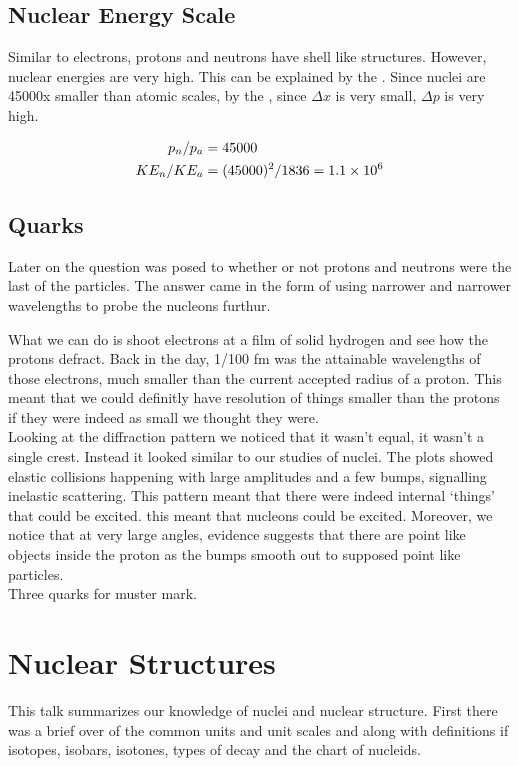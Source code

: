 \documentclass[english, 11pt]{article}
\begin{document}
    \subsection{Nuclear Energy Scale}

    Similar to electrons, protons and neutrons have shell like structures. However, nuclear energies are very high. This can be explained by the . Since nuclei are 45000x smaller than atomic scales, by the , since $\Delta x$ is very small, $\Delta p$ is very high. 

    \begin{align*}
      p_n / p_a &= 45000\\
      KE_n / KE_a &= (45000)^2 / 1836 = 1.1\times 10^{6}
    \end{align*}

    \subsection{Quarks}

    Later on the question was posed to whether or not protons and neutrons were the last of the particles. The answer came in the form of using narrower and narrower wavelengths to probe the nucleons furthur. 

    What we can do is shoot electrons at a film of solid hydrogen and see how the protons defract. Back in the day, 1/100 fm was the attainable wavelengths of those electrons, much smaller than the current accepted radius of a proton. This meant that we could definitly have resolution of things smaller than the protons if they were indeed as small we thought they were.\\

    Looking at the diffraction pattern we noticed that it wasn't equal, it wasn't a single crest. Instead it looked similar to our studies of nuclei. The plots showed elastic collisions happening with large amplitudes and a few bumps, signalling inelastic scattering. This pattern meant that there were indeed internal `things' that could be excited. this meant that nucleons could be excited. Moreover, we notice that at very large angles, evidence suggests that there are point like objects inside the proton as the bumps smooth out to supposed point like particles.\\

    Three quarks for muster mark. 

    \section{Nuclear Structures}
        This talk summarizes our knowledge of nuclei and nuclear structure. First there was a brief over of the common units and unit scales and along with definitions if isotopes, isobars, isotones, types of decay and the chart of nucleids. 
\end{document}
